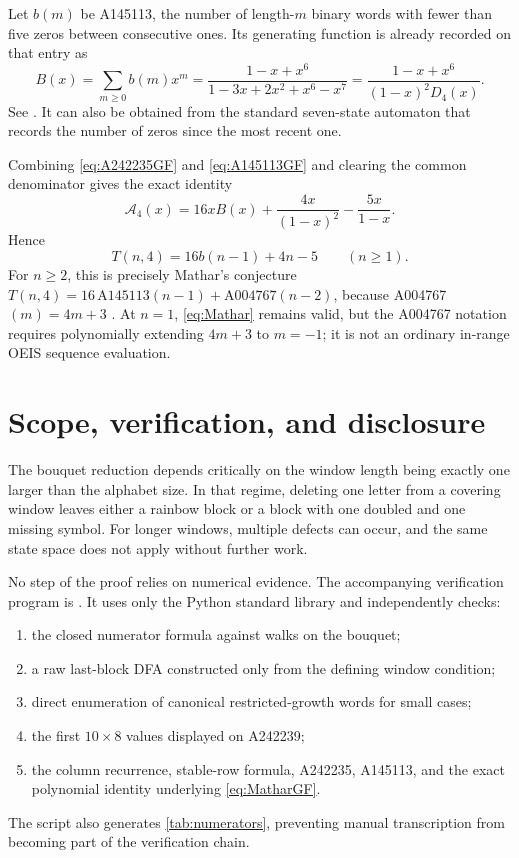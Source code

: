 \documentclass[11pt]{article}
\theoremstyle{remark}
\newcommand{\GF}{\mathcal A}
\begin{document}
Let $b(m)$ be A145113, the number of length-$m$ binary words with fewer than
five zeros between consecutive ones.  Its generating function is already
recorded on that entry as
\begin{equation}\label{eq:A145113GF}
 B(x)=\sum_{m\geq0}b(m)x^m
 =\frac{1-x+x^6}{1-3x+2x^2+x^6-x^7}
 =\frac{1-x+x^6}{(1-x)^2D_4(x)}.
\end{equation}
See \cite{oeisA145113}.  It can also be obtained from the standard seven-state
automaton that records the number of zeros since the most recent one.

Combining \eqref{eq:A242235GF} and \eqref{eq:A145113GF} and clearing the common
denominator gives the exact identity
\begin{equation}\label{eq:MatharGF}
 \GF_4(x)=16xB(x)+\frac{4x}{(1-x)^2}-\frac{5x}{1-x}.
\end{equation}
Hence
\begin{equation}\label{eq:Mathar}
 T(n,4)=16b(n-1)+4n-5\qquad(n\geq1).
\end{equation}
For $n\geq2$, this is precisely Mathar's conjecture
$T(n,4)=16\,\mathrm{A145113}(n-1)+\mathrm{A004767}(n-2)$, because
A004767$(m)=4m+3$ \cite{oeisA004767}.  At $n=1$, \eqref{eq:Mathar} remains
valid, but the A004767 notation requires polynomially extending $4m+3$ to
$m=-1$; it is not an ordinary in-range OEIS sequence evaluation.

\section{Scope, verification, and disclosure}

The bouquet reduction depends critically on the window length being exactly
one larger than the alphabet size.  In that regime, deleting one letter from a
covering window leaves either a rainbow block or a block with one doubled and
one missing symbol.  For longer windows, multiple defects can occur, and the
same state space does not apply without further work.

No step of the proof relies on numerical evidence.  The accompanying verification program is
.  It uses only the Python standard library and
independently checks:
\begin{enumerate}
\item the closed numerator formula against walks on the bouquet;
\item a raw last-block DFA constructed only from the defining window condition;
\item direct enumeration of canonical restricted-growth words for small cases;
\item the first $10\times8$ values displayed on A242239;
\item the column recurrence, stable-row formula, A242235, A145113, and the exact
      polynomial identity underlying \eqref{eq:MatharGF}.
\end{enumerate}
The script also generates \cref{tab:numerators}, preventing manual
transcription from becoming part of the verification chain.
\end{document}
